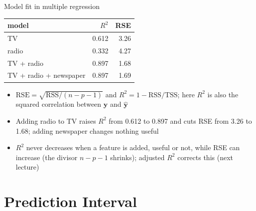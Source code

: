 \begin{frame}{Model fit in multiple regression}
    \begin{center}
        \small
        \begin{tabular}{lrr}
            \toprule
            model & $R^2$ & RSE \\
            \midrule
            TV & 0.612 & 3.26 \\
            radio & 0.332 & 4.27 \\
            TV + radio & 0.897 & 1.68 \\
            TV + radio + newspaper & 0.897 & 1.69 \\
            \bottomrule
        \end{tabular}
    \end{center}
    \begin{itemize}
        \item $\mathrm{RSE} = \sqrt{\mathrm{RSS}/(n-p-1)}$ and $R^2 = 1 - \mathrm{RSS}/\mathrm{TSS}$; here $R^2$ is also the squared correlation between $\mathbf{y}$ and $\hat{\mathbf{y}}$
        \item Adding radio to TV raises $R^2$ from 0.612 to 0.897 and cuts RSE from 3.26 to 1.68; adding newspaper changes nothing useful
        \item $R^2$ never decreases when a feature is added, useful or not, while RSE can increase (the divisor $n-p-1$ shrinks); adjusted $R^2$ corrects this (next lecture)
    \end{itemize}
\end{frame}


\section{Prediction Interval}


